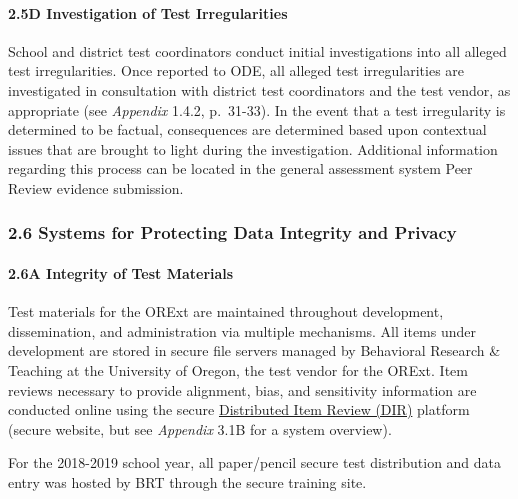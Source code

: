 \documentclass[]{article}
\let\oldparagraph\paragraph
\renewcommand{\paragraph}[1]{\oldparagraph{#1}\mbox{}}
\begin{document}
\hypertarget{d-investigation-of-test-irregularities}{%
\paragraph{2.5D Investigation of Test
Irregularities}\label{d-investigation-of-test-irregularities}}

School and district test coordinators conduct initial investigations
into all alleged test irregularities. Once reported to ODE, all alleged
test irregularities are investigated in consultation with district test
coordinators and the test vendor, as appropriate (see \emph{Appendix}
1.4.2, p.~31-33). In the event that a test irregularity is determined to
be factual, consequences are determined based upon contextual issues
that are brought to light during the investigation. Additional
information regarding this process can be located in the general
assessment system Peer Review evidence submission.

\hypertarget{systems-for-protecting-data-integrity-and-privacy}{%
\subsubsection{2.6 Systems for Protecting Data Integrity and
Privacy}\label{systems-for-protecting-data-integrity-and-privacy}}

\hypertarget{a-integrity-of-test-materials}{%
\paragraph{2.6A Integrity of Test
Materials}\label{a-integrity-of-test-materials}}

Test materials for the ORExt are maintained throughout development,
dissemination, and administration via multiple mechanisms. All items
under development are stored in secure file servers managed by
Behavioral Research \& Teaching at the University of Oregon, the test
vendor for the ORExt. Item reviews necessary to provide alignment, bias,
and sensitivity information are conducted online using the secure
\color{link}\href{http://brtitemreview.com}{Distributed Item Review
(DIR)}\color{black} platform (secure website, but see \emph{Appendix}
3.1B for a system overview).

For the 2018-2019 school year, all paper/pencil secure test distribution
and data entry was hosted by BRT through the secure training site.
\end{document}
